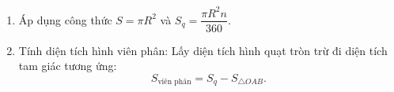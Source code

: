 \begin{enumerate}
\item Áp dụng công thức $S = \pi R^2$ và $S_q = \dfrac{\pi R^2 n}{360}$.
\item Tính diện tích hình viên phân: Lấy diện tích hình quạt tròn trừ đi diện tích tam giác tương ứng:
$$S_{\text{viên phân}} = S_q - S_{\triangle OAB}.$$
\end{enumerate}
